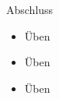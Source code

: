 \documentclass[10pt]{beamer} %
\begin{document}
\begin{frame}{Abschluss}
	
	\begin{itemize}
		\item Üben
		\item Üben
		\item Üben
	\end{itemize}
	
\end{frame}

	
	\appendix
	\setcounter{finalframe}{\value{framenumber}}
	
	\setcounter{framenumber}{\value{finalframe}}
\end{document}
